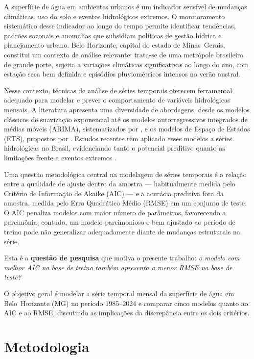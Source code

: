 \documentclass[12pt, a4paper]{article}
\begin{document}
A superfície de água em ambientes urbanos é um indicador sensível de mudanças
climáticas, uso do solo e eventos hidrológicos extremos. O monitoramento
sistemático desse indicador ao longo do tempo permite identificar tendências,
padrões sazonais e anomalias que subsidiam políticas de gestão hídrica e
planejamento urbano. Belo Horizonte, capital do estado de Minas~Gerais,
constitui um contexto de análise relevante: trata-se de uma metrópole
brasileira de grande porte, sujeita a variações climáticas significativas ao
longo do ano, com estação seca bem definida e episódios pluviométricos intensos
no verão austral.

Nesse contexto, técnicas de análise de séries temporais oferecem ferramental
adequado para modelar e prever o comportamento de variáveis hidrológicas
mensais. A literatura apresenta uma diversidade de abordagens, desde os modelos
clássicos de suavização exponencial \cite{holt1957,winters1960} até os modelos
autorregressivos integrados de médias móveis (ARIMA), sistematizados por
\cite{boxjenkins1994}, e os modelos de Espaço de Estados (ETS), propostos por
\cite{hyndman2008}. Estudos recentes têm aplicado esses modelos a séries
hidrológicas no Brasil, evidenciando tanto o potencial preditivo quanto as
limitações frente a eventos extremos \cite{borges2025,goulart2024}.

Uma questão metodológica central na modelagem de séries temporais é a relação
entre a qualidade de ajuste dentro da amostra --- habitualmente medida pelo
Critério de Informação de Akaike (AIC) \cite{akaike1974} --- e a acurácia
preditiva fora da amostra, medida pelo Erro Quadrático Médio (RMSE) em um
conjunto de teste. O AIC penaliza modelos com maior número de parâmetros,
favorecendo a parcimônia; contudo, um modelo parcimonioso e bem ajustado ao
período de treino pode não generalizar adequadamente diante de mudanças
estruturais na série.

Esta é a \textbf{questão de pesquisa} que motiva o presente trabalho:
\emph{o modelo com melhor AIC na base de treino também apresenta o menor RMSE
na base de teste?}

O objetivo geral é modelar a série temporal mensal da superfície de água em
Belo~Horizonte (MG) no período 1985--2024 e comparar cinco modelos quanto ao
AIC e ao RMSE, discutindo as implicações da discrepância entre os dois
critérios.

\section{Metodologia}
\end{document}
